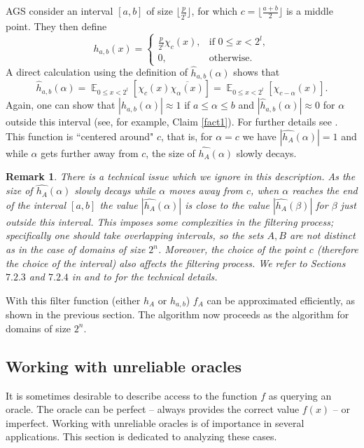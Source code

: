 \documentclass[11pt]{article}
\newtheorem{remark}[theorem]{Remark}
\theoremstyle{definition}
\DeclareMathOperator*{\E}{\mathbb{E}}
\begin{document}
AGS consider an interval $[a,b]$ of size $\lfloor \frac{p}{2^l} \rfloor$, for which $c = \lfloor \frac{a+b}{2} \rfloor$ is a middle point. They then define
\[h_{a,b}(x) = \begin{cases} \frac{p}{2^l}\chi_{c}(x), & \text{if }0\leq x < 2^l,\\ 0, & \text{otherwise.}\end{cases}\]
A direct calculation using the definition of $\widehat{h}_{a,b}(\alpha)$ shows that
\[\widehat{h}_{a,b}(\alpha) = \E_{0\leq x < 2^l}\left[\chi_c(x)\overline{\chi_\alpha(x)}\right] = \E_{0\leq x < 2^l}\left[ \chi_{c-\alpha}(x)\right].\]
Again, one can show that $|\widehat{h}_{a,b}(\alpha)| \approx 1$ if $a\leq \alpha \leq b$ and $|\widehat{h}_{a,b}(\alpha)| \approx 0$ for $\alpha$ outside this interval (see, for example, Claim \ref{fact1}). For further details see \cite{AGS,AKA-thesis}. This function is ``centered around" $c$, that is, for $\alpha = c$ we have $|\widehat{h_A}(\alpha)| = 1$ and while $\alpha$ gets further away from $c$, the size of $\widehat{h_A}(\alpha)$ slowly decays.

\begin{remark}\label{rem_intervals}
    There is a technical issue which we ignore in this description. As the size of $\widehat{h_A}(\alpha)$ slowly decays while $\alpha$ moves away from $c$, when $\alpha$ reaches the end of the interval $[a,b]$ the value $|\widehat{h_A}(\alpha)|$ is close to the value $|\widehat{h_A}(\beta)|$ for $\beta$ just outside this interval. This imposes some complexities in the filtering process; specifically one should take overlapping intervals, so the sets $A,B$ are not distinct as in the case of domains of size $2^n$. Moreover, the choice of the point $c$ (therefore the choice of the interval) also affects the filtering process. We refer to Sections $7.2.3$ and $7.2.4$ in \cite{AGS} and to \cite[Section 3]{AKA-thesis} for the technical details.
\end{remark}

With this filter function (either $h_A$ or $h_{a,b}$) $f_A$ can be approximated efficiently, as shown in the previous section. The algorithm now proceeds as the algorithm for domains of size $2^n$.

\subsection{Working with unreliable oracles}
\label{sec:noisy-oracle}

It is sometimes desirable to describe access to the function $f$ as querying an oracle. The oracle can be perfect -- always provides the correct value $f(x)$ -- or imperfect. Working with unreliable oracles is of importance in several applications. This section is dedicated to analyzing these cases.
\end{document}
